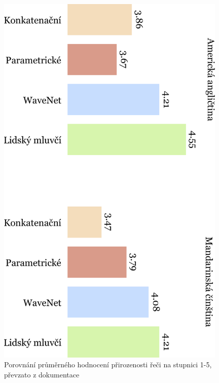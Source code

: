 \begin{figure}[h]
    \centering
    \includegraphics[angle=90, width=0.98\textwidth]{../img/wavenet-comparison.pdf}
    \caption{Porovnání průměrného hodnocení přirozenosti řeči na stupnici 1-5, převzato z dokumentace
        \citet[upraveno a přeloženo autorem]{google_tts}}
    \label{img-wavenet}
\end{figure}